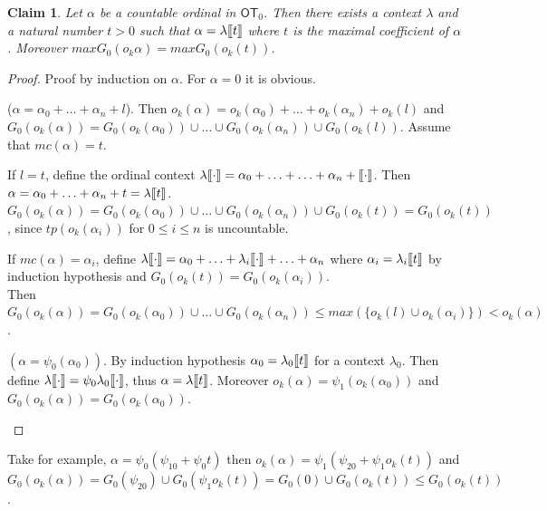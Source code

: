 \documentclass{amsart}
\theoremstyle{plain}
\theoremstyle{plain}
\newtheorem{claim}[theorem]{Claim}
\def\scbrl{[\hspace{-.14em}[}
\def\scbrr{]\hspace{-.14em}]}
\def\scbr#1{\scbrl#1\scbrr}
\newcommand\OT{\mathsf{OT}}
\newcommand{\ok}{o_{k}}
\newcommand{\al}{{\alpha}}
\newcommand{\la}{\lambda}
\def\scbrl{[\hspace{-.14em}[}
\def\scbrr{]\hspace{-.14em}]}
\def\scbr#1{\scbrl#1\scbrr}
\begin{document}
\begin{claim}\label{cl:maxCoef}
Let $\al$ be a countable ordinal in $\OT_0$. Then there exists a context $\la$ and a natural number $t>0$ such that $\al = \la\scbr{t}$ where $t$ is the maximal coefficient of $\al$.
Moreover $max G_0(\ok\al) = maxG_0(\ok(t))$.%
\end{claim}
\begin{proof}
Proof by induction on $\al$.
For $\al=0$ it is obvious.
\begin{Cases}
    \item ($\al= \al_0+ \ldots +\al_n +l$). Then $\ok(\al) =\ok(\al_0)+\ldots+\ok(\al_n)+\ok(l)$ and $G_0(\ok(\al)) = G_0(\ok(\al_0)) \cup \ldots \cup G_0(\ok(\al_n)) \cup G_0(\ok(l))$.
    Assume that $mc(\al)=t$.
    
    \begin{Cases}
        \item  If $l=t$, define the ordinal context 
    $\la\scbr{\cdot} = \al_0+\ldots +\ldots+\al_n+\scbr{\cdot}$. Then $\al =\al_0+\ldots+\al_n+t=\la\scbr{t}$.\\
    $G_0(\ok(\al))=G_0(\ok(\al_0))\cup\ldots \cup G_0(\ok(\al_n))\cup G_0(\ok(t))=G_0(\ok(t))$, 
    since $tp(\ok(\al_i))$ for $0\leq i\leq n$ is uncountable.\medskip

    \item 
    If $mc(\al)=\al_i$, define
    $\la\scbr{\cdot} = \al_0+\ldots +\la_i\scbr{\cdot}+\ldots+\al_n$ where $\al_i=\la_i\scbr{t}$ by induction hypothesis
    and $G_0(\ok(t))=G_0(\ok(\al_i))$.
    \\
    Then $G_0(\ok(\al)) = G_0(\ok(\al_0)) \cup \ldots \cup G_0(\ok(\al_n)) \leq max(\{\ok(l) \cup \ok(\al_i)\}) < \ok(\al)$.
    \end{Cases}

    \item $(\al = \psi_0(\al_0))$.
      By induction hypothesis $\al_0=\la_0\scbr{t}$ for a context $\la_0$. Then define $\la\scbr{\cdot} = \psi_0\la_0\scbr{\cdot}$, thus $\al = \la\scbr{t}$.
    Moreover $\ok(\al)= \psi_1(\ok(\al_0))$ and $G_0(\ok(\al))= G_0(\ok(\al_0))$.            
    
\end{Cases}
\end{proof}
Take for example, $\al = \psi_0(\psi_10 +\psi_0t)$ then $\ok(\al)=\psi_1(\psi_20 + \psi_1 \ok(t))$ and $G_0(\ok(\al))= G_0(\psi_20) \cup G_0(\psi_1\ok(t))= G_0(0) \cup G_0(\ok(t))\leq G_0(\ok(t))$.
\medskip\\
\end{document}
